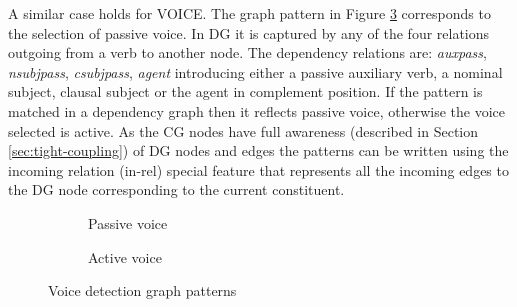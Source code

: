     A similar case holds for VOICE. The graph pattern in Figure \ref{fig:voice-pattern7} corresponds to the selection of passive voice. In DG it is captured by any of the four relations outgoing from a verb to another node. The dependency relations are: \textit{auxpass}, \textit{nsubjpass}, \textit{csubjpass}, \textit{agent} introducing either a passive auxiliary verb, a nominal subject, clausal subject or the agent in complement position. If the pattern is matched in a dependency graph then it reflects passive voice, otherwise the voice selected is active. As the CG nodes have full awareness (described in Section \ref{sec:tight-coupling}) of DG nodes and edges the patterns can be written using the incoming relation (in-rel) special feature that represents all the incoming edges to the DG node corresponding to the current constituent. 

    \begin{figure}[!ht]
        \centering
        \begin{subfigure}[t]{0.47\textwidth}
            \centering
            \caption{Passive voice}
            \label{fig:voice-pattern5}
        \end{subfigure}
        \begin{subfigure}[t]{0.47\textwidth}
            \centering
            \caption{Active voice}
            \label{fig:voice-pattern6}
        \end{subfigure}
        \caption{Voice detection graph patterns}
        \label{fig:voice-pattern7}
    \end{figure}

